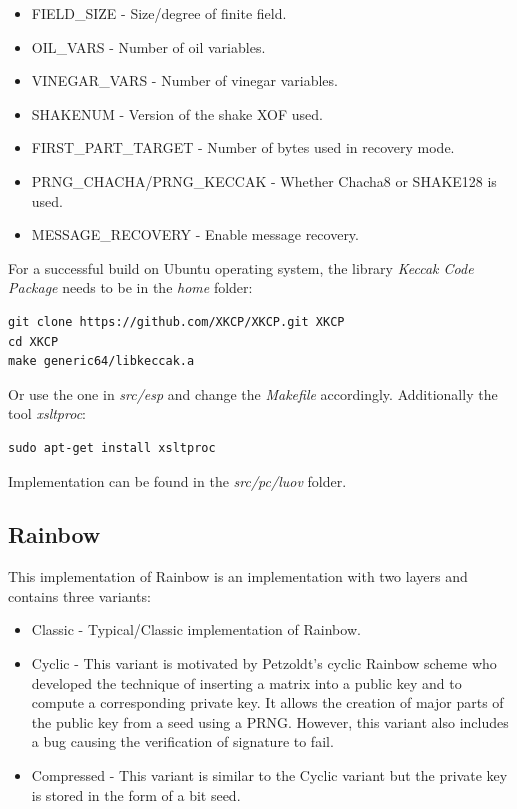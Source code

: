 \documentclass[thesis=M,english]{FITthesis}[2019/12/23]
\begin{document}
\begin{itemize}
\item	FIELD\_SIZE - Size/degree of finite field.
\item	OIL\_VARS - Number of oil variables.
\item	VINEGAR\_VARS - Number of vinegar variables.
\item	SHAKENUM - Version of the shake XOF used.
\item	FIRST\_PART\_TARGET - Number of bytes used in recovery mode.
\item	PRNG\_CHACHA/PRNG\_KECCAK - Whether Chacha8 or SHAKE128 is used.
\item	MESSAGE\_RECOVERY - Enable message recovery.
\end{itemize}
For a successful build on Ubuntu operating system, the library \textit{Keccak Code Package} needs to be in the \textit{home} folder:
\begin{lstlisting}[frame=single]
git clone https://github.com/XKCP/XKCP.git XKCP
cd XKCP
make generic64/libkeccak.a
\end{lstlisting}
Or use the one in \textit{src/esp} and change the \textit{Makefile} accordingly. Additionally the tool \textit{xsltproc}:
\begin{lstlisting}[frame=single]
sudo apt-get install xsltproc
\end{lstlisting}

\bigskip
\noindent
Implementation can be found in the \textit{src/pc/luov} folder.

\subsection{Rainbow}
This implementation of Rainbow is an implementation with two layers and contains three variants:
\begin{itemize}
\item	Classic - Typical/Classic implementation of Rainbow.
\item	Cyclic - This variant is motivated by Petzoldt's cyclic Rainbow scheme\cite{L-RB-CYC} who developed the technique of inserting a matrix into a public key and to compute a corresponding private key. It allows the creation of major parts of the public key from a seed using a PRNG. However, this variant also includes a bug causing the verification of signature to fail. 
\item	Compressed - This variant is similar to the Cyclic variant but the private key is stored in the form of a bit seed.
\end{itemize}
\end{document}
